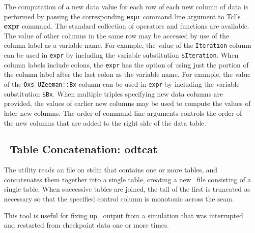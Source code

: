 The computation of a new data value for each row of each new column
of data is performed by passing the corresponding {\tt expr} command
line argument to Tcl's {\bf expr} command.  The standard collection
of operators and functions are available.  The value of other columns
in the same row may be accessed by use of the column label as a variable
name.  For example, the value of the {\tt Iteration} column can be used
in {\tt expr} by including the variable substitution {\tt \$Iteration}.
When column labels include colons, the {\tt expr} has the option of using
just the portion of the column label after the last colon as the variable
name.  For example, the value of the {\tt Oxs\_UZeeman::Bx} column can
be used in {\tt expr} by including the variable substitution {\tt \$Bx}.
When multiple triples specifying new data columns are provided, the
values of earlier new columns may be used to compute the values of later
new columns.  The order of command line arguments controls the order of
the new columns that are added to the right side of the data table.


\subsection{\ODT\ Table Concatenation: odtcat}\label{sec:odtcat}%

The  utility reads an
 file on stdin that
contains one or more tables, and concatenates them together into a
single table, creating a new \ODT\ file consisting of a single table.
When successive tables are joined, the tail of the first is truncated as
necessary so that the specified control column is monotonic across the
seam.

This tool is useful for fixing up \ODT\ output from a simulation that
was interrupted and restarted from checkpoint data one or more times.

